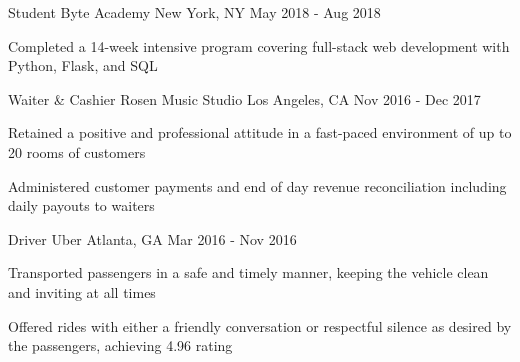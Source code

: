 

\begin{cventries}

  \cventry
    {Student} %
    {Byte Academy} %
    {New York, NY} %
    {May 2018 - Aug 2018} %
    {
      \begin{cvitems} %
        \item {Completed a 14-week intensive program covering full-stack web development with Python, Flask, and SQL}
      \end{cvitems}
    }

  \cventry
    {Waiter \& Cashier} %
    {Rosen Music Studio} %
    {Los Angeles, CA} %
    {Nov 2016 - Dec 2017} %
    {
      \begin{cvitems} %
        \item {Retained a positive and professional attitude in a fast-paced environment of up to 20 rooms of customers}
        \item {Administered customer payments and end of day revenue reconciliation including daily payouts to waiters}
      \end{cvitems}
    }

  \cventry
    {Driver} %
    {Uber} %
    {Atlanta, GA} %
    {Mar 2016 - Nov 2016} %
    {
      \begin{cvitems} %
        \item {Transported passengers in a safe and timely manner, keeping the vehicle clean and inviting at all times}
        \item {Offered rides with either a friendly conversation or respectful silence as desired by the passengers, achieving 4.96 rating}
      \end{cvitems}
    }


\end{cventries}
